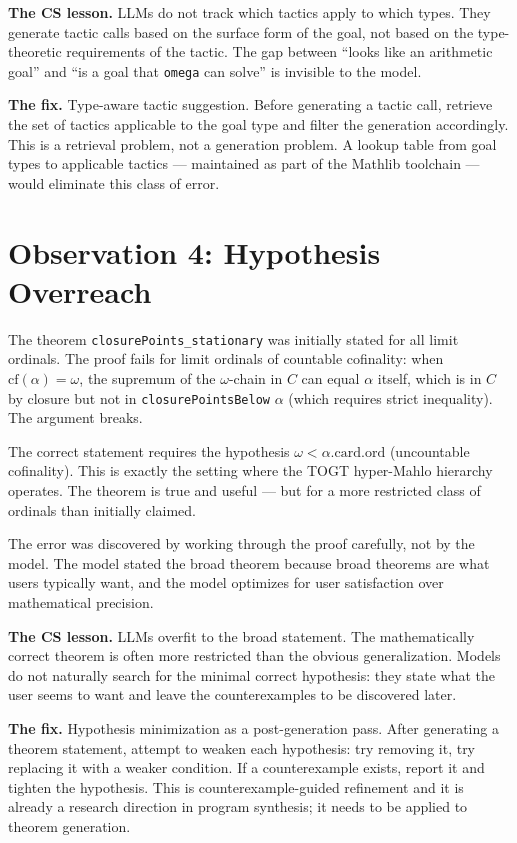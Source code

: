 \documentclass[19pt]{book}
\theoremstyle{plain}
\theoremstyle{definition}
\theoremstyle{remark}
\begin{document}
\textbf{The CS lesson.} LLMs do not track which tactics apply to
which types. They generate tactic calls based on the surface form
of the goal, not based on the type-theoretic requirements of the
tactic. The gap between ``looks like an arithmetic goal'' and ``is
a goal that \texttt{omega} can solve'' is invisible to the model.

\textbf{The fix.} Type-aware tactic suggestion. Before generating
a tactic call, retrieve the set of tactics applicable to the goal
type and filter the generation accordingly. This is a retrieval
problem, not a generation problem. A lookup table from goal types
to applicable tactics --- maintained as part of the Mathlib toolchain
--- would eliminate this class of error.

\section{Observation 4: Hypothesis Overreach}
\label{sec:hypothesis}

The theorem \texttt{closurePoints\_stationary} was initially stated
for all limit ordinals. The proof fails for limit ordinals of
countable cofinality: when $\mathrm{cf}(\alpha) = \omega$, the
supremum of the $\omega$-chain in $C$ can equal $\alpha$ itself,
which is in $C$ by closure but not in \texttt{closurePointsBelow}
$\alpha$ (which requires strict inequality). The argument breaks.

The correct statement requires the hypothesis
$\omega < \alpha.\mathrm{card}.\mathrm{ord}$
(uncountable cofinality). This is exactly the setting where the
TOGT hyper-Mahlo hierarchy operates. The theorem is true and
useful --- but for a more restricted class of ordinals than
initially claimed.

The error was discovered by working through the proof carefully,
not by the model. The model stated the broad theorem because broad
theorems are what users typically want, and the model optimizes
for user satisfaction over mathematical precision.

\textbf{The CS lesson.} LLMs overfit to the broad statement.
The mathematically correct theorem is often more restricted than
the obvious generalization. Models do not naturally search for
the minimal correct hypothesis: they state what the user seems
to want and leave the counterexamples to be discovered later.

\textbf{The fix.} Hypothesis minimization as a post-generation
pass. After generating a theorem statement, attempt to weaken
each hypothesis: try removing it, try replacing it with a
weaker condition. If a counterexample exists, report it and
tighten the hypothesis. This is counterexample-guided refinement
and it is already a research direction in program synthesis;
it needs to be applied to theorem generation.
\end{document}
